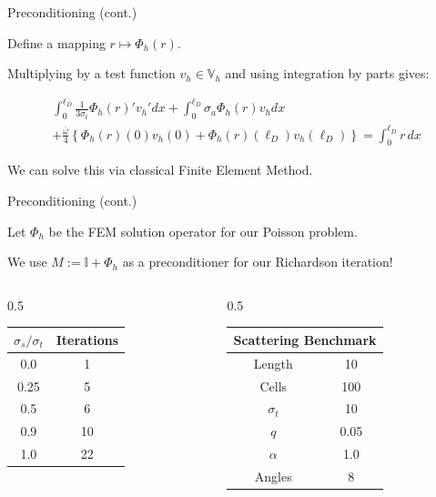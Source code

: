 \documentclass{beamer}
\newcommand{\lt}{\left}
\newcommand{\rt}{\right}
\theoremstyle{plain}
\theoremstyle{definition}
\begin{document}
\begin{frame}{Preconditioning (cont.)}

Define a mapping $r \mapsto \Phi_h(r)$.

Multiplying by a test function $v_h \in \mathbb{V}_h$ and using integration by parts gives:

 \begin{multline*}
    \int_0^{\ell_D} \frac{1}{3\sigma_t} \Phi_h(r)' v_h' dx + \int_0^{\ell_D} \sigma_a \Phi_h(r) v_h dx \\
    + \frac{\overline \omega}{4} \lt\{\Phi_h(r) (0) v_h(0) + \Phi_h(r)(\ell_D) v_h(\ell_D)\rt\} = \int_0^{\ell_D} r\, dx 
 \end{multline*}   

 We can solve this via classical Finite Element Method.
  
    
\end{frame}

\begin{frame}{Preconditioning (cont.)}

Let $\Phi_h$ be the FEM solution operator for our Poisson problem.

We use $M := \mathbb{I} + \Phi_h$ as a preconditioner for our Richardson iteration!

\hspace{}

\begin{columns}[onlytextwidth]
    \begin{column}{0.5\textwidth}
        \centering
        \begin{tabular}{c|c}
        \hline
            \multicolumn{1}{c}{$\sigma_s/ \sigma_t$} & \multicolumn{1}{c}{Iterations} 
            \\ \hline
            0.0 & 1\\
            0.25 & 5\\
            0.5 & 6\\
            0.9 & 10\\
            1.0 & 22\\
            \hline
        \end{tabular}
    \end{column}
    \begin{column}{0.5\textwidth}
        \centering
        \small 
        \begin{tabular}{c|c}
            \hline
            \multicolumn{2}{c}{Scattering Benchmark}\\
            \hline
            Length & 10\\
            Cells & 100 \\
            $\sigma_t$ & 10 \\
            $q$ & 0.05 \\
            \hline
            $\alpha$ & \multicolumn{1}{c}{1.0}  \\
            Angles & \multicolumn{1}{c}{8}  \\
            \hline
        \end{tabular}

    \end{column}
\end{columns}

\end{frame}
\end{document}
